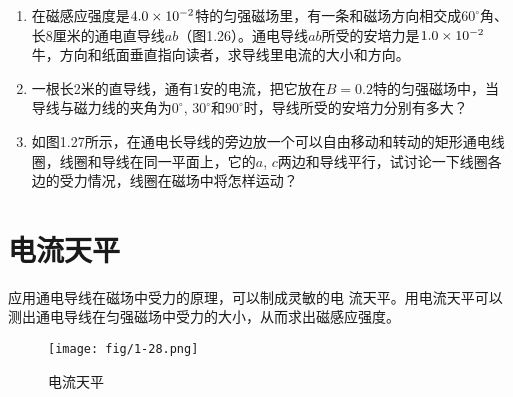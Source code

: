 \begin{enumerate}
\begin{figure}[htp]
\begin{minipage}[t]{0.48\textwidth}
\caption{}
\end{minipage}
\begin{minipage}[t]{0.48\textwidth}
\centering
{}
\caption{}
\end{minipage}
\end{figure}



    \item 在磁感应强度是$4.0\times10^{-2}$特的匀强磁场里，有一条和磁场方向相交成$60^\circ$角、长8厘米的通电直导线$ab$（图1.26）。通电导线$ab$所受的安培力是$1.0\times10^{-2}$牛，方向和纸面垂直指向读者，求导线里电流的大小和方向。
    \item 一根长2米的直导线，通有1安的电流，把它放在$B=0.2$特的匀强磁场中，当导线与磁力线的夹角为$0^\circ$, $30^\circ$和$90^\circ$时，导线所受的安培力分别有多大？

    \item 如图1.27所示，在通电长导线的旁边放一个可以自由移动和转动的矩形通电线圈，线圈和导线在同一平面上，它的$a$, $c$两边和导线平行，试讨论一下线圈各边的受力情况，线圈在磁场中将怎样运动？
\end{enumerate}

\section{电流天平}
应用通电导线在磁场中受力的原理，可以制成灵敏的电
流天平。用电流天平可以测出通电导线在匀强磁场中受力的大小，从而求出磁感应强度。
    \begin{figure}[htp]\centering
	\texttt{[image: fig/1-28.png]}
	\caption{电流天平}
\end{figure}

